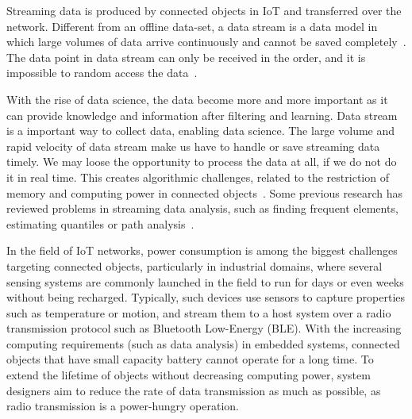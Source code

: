 Streaming data is produced by connected objects in IoT and transferred over
the network. Different from an offline data-set, a data stream is a data
model in which large volumes of data arrive continuously and cannot be
saved completely~\cite{o2002streaming}. The data point in data stream can
only be received in the order, and it is impossible to random access the
data~\cite{o2002streaming}.

With the rise of data science, the data become more and more important as it
can provide knowledge and information after filtering and learning.
Data stream is a important way to collect data, enabling data science. The large volume and rapid velocity of data stream make us have to handle or save streaming data timely. We may loose the
opportunity to process the data at all, if we do not do it in real time.
This creates algorithmic challenges, related to the restriction of memory
and computing power in connected objects~\cite{o2002streaming}. Some
previous research has reviewed problems in streaming data analysis, such as
finding frequent elements, estimating quantiles or path analysis~\cite{kejariwal2015real}.


In the field of IoT networks, power consumption is among the biggest challenges
targeting connected objects, particularly in industrial domains, where
several sensing systems are commonly launched in the field to run for days or
even weeks without being recharged. Typically, such devices use sensors to
capture properties such as temperature or motion, and stream them to a host
system over a radio transmission protocol such as Bluetooth Low-Energy (BLE).
With the increasing computing requirements (such as data analysis) in embedded
systems, connected objects that have small capacity
battery cannot operate for a long time. To extend the lifetime of objects without
decreasing computing power, system designers aim to reduce the rate of data
transmission as much as possible, as radio transmission is a power-hungry
operation.

